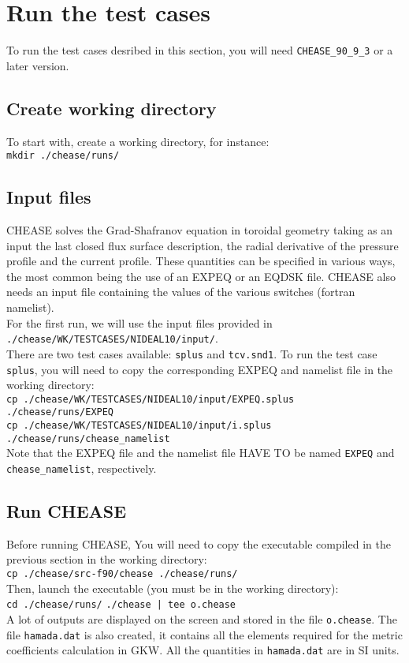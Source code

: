 \documentclass[a4paper,12pt]{article}
\begin{document}
\section{Run the test cases}

To run the test cases desribed in this section, you will need \texttt{CHEASE\_90\_9\_3} or a later version.

\subsection{Create working directory}
To start with, create a working directory, for instance:\\
\texttt{\small mkdir ./chease/runs/}

\subsection{Input files}
CHEASE solves the Grad-Shafranov equation in toroidal geometry taking as an input the last closed flux surface description, the radial derivative of the pressure profile and the current profile. These quantities can be specified in various ways, the most common being the use of an EXPEQ or an EQDSK file. CHEASE also needs an input file containing the values of the various switches (fortran namelist).\\

For the first run, we will use the input files provided in\\
\texttt{./chease/WK/TESTCASES/NIDEAL10/input/}.\\
There are two test cases available: \texttt{splus} and \texttt{tcv.snd1}. 
To run the test case \texttt{splus}, you will need to copy the corresponding EXPEQ and namelist file in the working directory:\\
\texttt{\small cp ./chease/WK/TESTCASES/NIDEAL10/input/EXPEQ.splus ./chease/runs/EXPEQ}\\
\texttt{\small cp ./chease/WK/TESTCASES/NIDEAL10/input/i.splus ./chease/runs/chease\_namelist}\\
Note that the EXPEQ file and the namelist file HAVE TO be named \texttt{EXPEQ} and \texttt{chease\_namelist}, respectively.

\subsection{Run CHEASE}
Before running CHEASE, You will need to copy the executable compiled in the previous section in the working directory:\\
\texttt{\small cp ./chease/src-f90/chease ./chease/runs/}\\
Then, launch the executable (you must be in the working directory):\\
\texttt{\small cd ./chease/runs/}
\texttt{\small ./chease | tee o.chease}\\
A lot of outputs are displayed on the screen and stored in the file \texttt{o.chease}. The file \texttt{hamada.dat} is also created, it contains all the elements required for the metric coefficients calculation in GKW. All the quantities in \texttt{hamada.dat} are in SI units.
\end{document}
